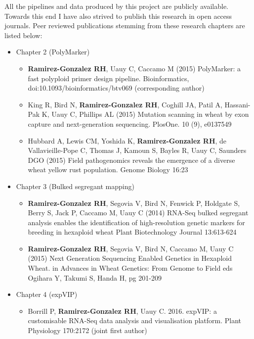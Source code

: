 All the pipelines and data produced by this project are publicly available. Towards this end I have also strived to publish this research in open access journals. Peer reviewed publications stemming from these research chapters are listed below: 

\begin{itemize}
\item Chapter 2 (PolyMarker)
\begin{itemize}
	\item \textbf{Ramirez-Gonzalez RH}, Uauy C, Caccamo M (2015) PolyMarker: a fast polyploid primer design pipeline. Bioinformatics, doi:10.1093/bioinformatics/btv069 (corresponding author)
	\item King R, Bird N, \textbf{Ramirez-Gonzalez RH}, Coghill JA, Patil A, Hassani-Pak K, Uauy C, Phillips AL (2015) Mutation scanning in wheat by exon capture and next-generation sequencing. PlosOne. 10 (9), e0137549
	\item Hubbard A, Lewis CM, Yoshida K, \textbf{\textbf{Ramirez-Gonzalez RH}}, de Vallavieille-Pope C, Thomas J, Kamoun S, Bayles R, Uauy C, Saunders DGO (2015) Field pathogenomics reveals the emergence of a diverse wheat yellow rust population. Genome Biology 16:23 
\end{itemize}

 \item Chapter 3 (Bulked segregant mapping)
\begin{itemize}
\item	\textbf{Ramirez-Gonzalez RH}, Segovia V, Bird N, Fenwick P, Holdgate S, Berry S, Jack P, Caccamo M, Uauy C (2014) RNA-Seq bulked segregant analysis enables the identification of high-resolution genetic markers for breeding in hexaploid wheat Plant Biotechnology Journal 13:613-624
\item	\textbf{Ramirez-Gonzalez RH}, Segovia V, Bird N, Caccamo M, Uauy C (2015) Next Generation Sequencing Enabled Genetics in Hexaploid Wheat. in Advances in Wheat Genetics: From Genome to Field eds Ogihara Y, Takumi S, Handa H, pg 201-209
\end{itemize}
\item Chapter 4 (expVIP)
\begin{itemize}
	\item Borrill P, \textbf{Ramirez-Gonzalez RH}, Uauy C. 2016. expVIP: a customisable RNA-Seq data analysis and visualisation platform. Plant Physiology 170:2172 (joint first author) 
\end{itemize}
\end{itemize}


